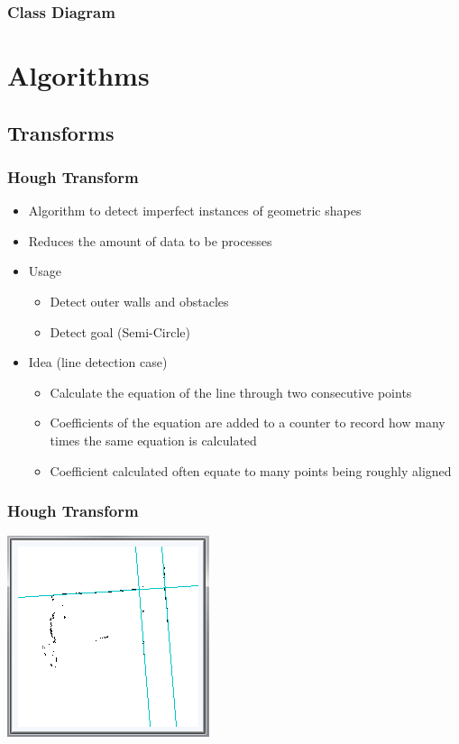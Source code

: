 \documentclass{beamer}
\begin{document}
\begin{frame}
\frametitle{Class Diagram}
\end{frame}

\section{Algorithms}
\subsection{Transforms}
\begin{frame}
\frametitle{Hough Transform}
\begin{itemize}
\item Algorithm to detect imperfect instances of geometric shapes
\item Reduces the amount of data to be processes
\item Usage
\begin{itemize}
\item Detect outer walls and obstacles
\item Detect goal (Semi-Circle)
\end{itemize}
\item Idea (line detection case)
\begin{itemize}
\item Calculate the equation of the line through two consecutive points
\item Coefficients of the equation are added to a counter to record how many times the same equation is calculated
\item Coefficient calculated often equate to many points being roughly aligned	
\end{itemize}
\end{itemize}
\end{frame}

\begin{frame}
\frametitle{Hough Transform}
\includegraphics[scale=0.7]{assets/images/HoughTransform.png}
\end{frame}
\end{document}
